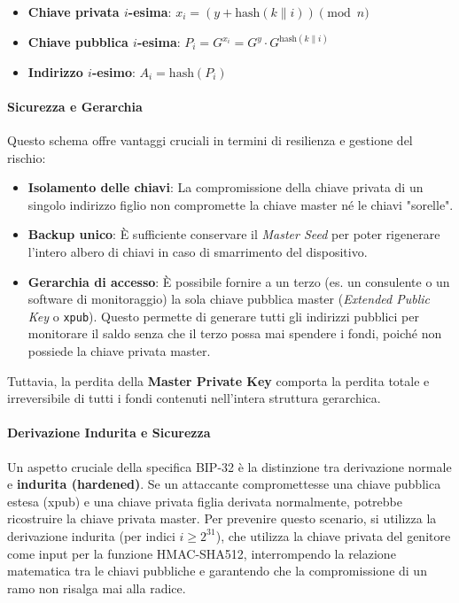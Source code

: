 \begin{itemize}
    \item \textbf{Chiave privata $i$-esima}: $x_i = (y + \text{hash}(k \parallel i)) \pmod n$
    \item \textbf{Chiave pubblica $i$-esima}: $P_i = G^{x_i} = G^y \cdot G^{\text{hash}(k \parallel i)}$
    \item \textbf{Indirizzo $i$-esimo}: $A_i = \text{hash}(P_i)$
\end{itemize}

\paragraph{Sicurezza e Gerarchia}
Questo schema offre vantaggi cruciali in termini di resilienza e gestione del rischio:
\begin{itemize}
    \item \textbf{Isolamento delle chiavi}: La compromissione della chiave privata di un singolo indirizzo figlio non compromette la chiave master né le chiavi "sorelle".
    \item \textbf{Backup unico}: È sufficiente conservare il \textit{Master Seed} per poter rigenerare l'intero albero di chiavi in caso di smarrimento del dispositivo.
    \item \textbf{Gerarchia di accesso}: È possibile fornire a un terzo (es. un consulente o un software di monitoraggio) la sola chiave pubblica master (\textit{Extended Public Key} o \texttt{xpub}). Questo permette di generare tutti gli indirizzi pubblici per monitorare il saldo senza che il terzo possa mai spendere i fondi, poiché non possiede la chiave privata master.
\end{itemize}

Tuttavia, la perdita della \textbf{Master Private Key} comporta la perdita totale e irreversibile di tutti i fondi contenuti nell'intera struttura gerarchica.

\paragraph{Derivazione Indurita e Sicurezza}
Un aspetto cruciale della specifica BIP-32 è la distinzione tra derivazione normale e \textbf{indurita (hardened)}. Se un attaccante compromettesse una chiave pubblica estesa (xpub) e una chiave privata figlia derivata normalmente, potrebbe ricostruire la chiave privata master. Per prevenire questo scenario, si utilizza la derivazione indurita (per indici $i \ge 2^{31}$), che utilizza la chiave privata del genitore come input per la funzione HMAC-SHA512, interrompendo la relazione matematica tra le chiavi pubbliche e garantendo che la compromissione di un ramo non risalga mai alla radice.

